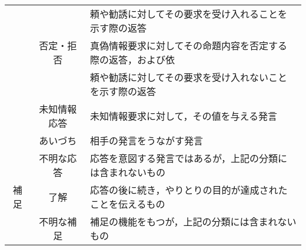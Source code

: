 \begin{table}[tbt]
\begin{center}
\begin{tabular}{|c|c|l|}
      &&頼や勧誘に対してその要求を受け入れることを示す際の返答\\
      &否定・拒否&真偽情報要求に対してその命題内容を否定する際の返答，および依\\
      &&頼や勧誘に対してその要求を受け入れないことを示す際の返答\\
      &未知情報応答&未知情報要求に対して，その値を与える発言\\
      &あいづち&相手の発言をうながす発言\\
      &不明な応答&応答を意図する発言ではあるが，上記の分類には含まれないもの\\
      \hline
      補足&了解&応答の後に続き，やりとりの目的が達成されたことを伝えるもの\\
      &不明な補足&補足の機能をもつが，上記の分類には含まれないもの\\
      \hline
    \end{tabular}
  \end{center}
\end{table}


